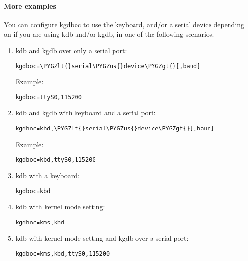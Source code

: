 \documentclass[a4paper,8pt,english]{sphinxmanual}
\def\PYGZus{\char`\_}
\def\PYGZlt{\char`\<}
\def\PYGZgt{\char`\>}
\begin{document}
\paragraph{More examples}
\label{dev-tools/kgdb:more-examples}
You can configure kgdboc to use the keyboard, and/or a serial device
depending on if you are using kdb and/or kgdb, in one of the following
scenarios.
\begin{enumerate}
\item {} 
kdb and kgdb over only a serial port:

\begin{Verbatim}[commandchars=\\\{\}]
kgdboc=\PYGZlt{}serial\PYGZus{}device\PYGZgt{}[,baud]
\end{Verbatim}

Example:

\begin{Verbatim}[commandchars=\\\{\}]
kgdboc=ttyS0,115200
\end{Verbatim}

\item {} 
kdb and kgdb with keyboard and a serial port:

\begin{Verbatim}[commandchars=\\\{\}]
kgdboc=kbd,\PYGZlt{}serial\PYGZus{}device\PYGZgt{}[,baud]
\end{Verbatim}

Example:

\begin{Verbatim}[commandchars=\\\{\}]
kgdboc=kbd,ttyS0,115200
\end{Verbatim}

\item {} 
kdb with a keyboard:

\begin{Verbatim}[commandchars=\\\{\}]
kgdboc=kbd
\end{Verbatim}

\item {} 
kdb with kernel mode setting:

\begin{Verbatim}[commandchars=\\\{\}]
kgdboc=kms,kbd
\end{Verbatim}

\item {} 
kdb with kernel mode setting and kgdb over a serial port:

\begin{Verbatim}[commandchars=\\\{\}]
kgdboc=kms,kbd,ttyS0,115200
\end{Verbatim}

\end{enumerate}
\end{document}
